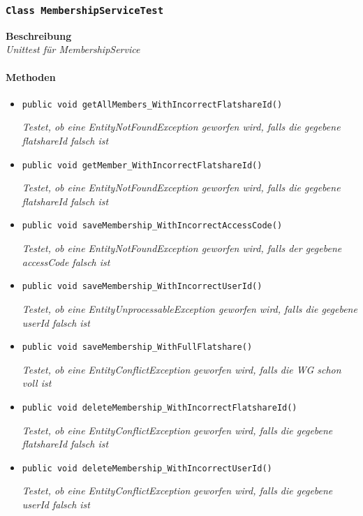  \subsubsection{\texttt{Class MembershipServiceTest}}
 \textbf{Beschreibung} \\
 \textit{Unittest für MembershipService}
 \paragraph*{Methoden}
 \begin{itemize}
    	\item{\texttt{public void getAllMembers\_WithIncorrectFlatshareId()}}
    	
    	\textit{Testet, ob eine EntityNotFoundException geworfen wird, falls die gegebene flatshareId falsch ist}
    	
    	\item{\texttt{public void getMember\_WithIncorrectFlatshareId()}}
    	
    	\textit{Testet, ob eine EntityNotFoundException geworfen wird, falls die gegebene flatshareId falsch ist}
    	
    	\item{\texttt{public void saveMembership\_WithIncorrectAccessCode()}}
    	
    	\textit{Testet, ob eine EntityNotFoundException geworfen wird, falls der gegebene accessCode falsch ist}
    	
    	\item{\texttt{public void saveMembership\_WithIncorrectUserId()}}
    	
    	\textit{Testet, ob eine EntityUnprocessableException geworfen wird, falls die gegebene userId falsch ist}
    	
    	\item{\texttt{public void saveMembership\_WithFullFlatshare()}}
    	
    	\textit{Testet, ob eine EntityConflictException geworfen wird, falls die WG schon voll ist}
    	
    	\item{\texttt{public void deleteMembership\_WithIncorrectFlatshareId()}}
    	
    	\textit{Testet, ob eine EntityConflictException geworfen wird, falls die gegebene flatshareId falsch ist}
    	
    	\item{\texttt{public void deleteMembership\_WithIncorrectUserId()}}
    	
    	\textit{Testet, ob eine EntityConflictException geworfen wird, falls die gegebene userId falsch ist}
 \end{itemize}
 

